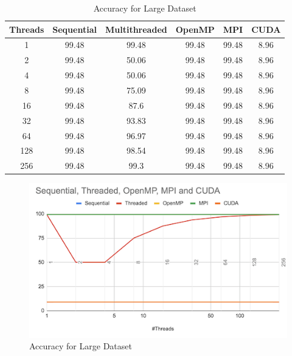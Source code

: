 \documentclass[conference]{IEEEtran}
\begin{document}
\begin{table}
    \begin{tabular}{||c | c | c | c | c | c||} 
     \hline
     Threads & Sequential & Multithreaded & OpenMP & MPI & CUDA \\ [0.1ex] 
     \hline\hline
    1 & 99.48 & 99.48 & 99.48 & 99.48 & 8.96 \\ [.1ex] 
     \hline
    2 & 99.48 & 50.06 & 99.48 & 99.48 & 8.96 \\ [.1ex] 
     \hline
    4 & 99.48 & 50.06 & 99.48 & 99.48 & 8.96 \\ [.1ex] 
     \hline
    8 & 99.48 & 75.09 & 99.48 & 99.48 & 8.96 \\ [.1ex] 
     \hline
    16 & 99.48 & 87.6 & 99.48 & 99.48 & 8.96 \\ [.1ex] 
     \hline
    32 & 99.48 & 93.83 & 99.48 & 99.48 & 8.96 \\ [.1ex] 
     \hline
    64 & 99.48 & 96.97 & 99.48 & 99.48 & 8.96 \\ [.1ex] 
     \hline
    128 & 99.48 & 98.54 & 99.48 & 99.48 & 8.96 \\ [.1ex] 
     \hline
    256 & 99.48 & 99.3 & 99.48 & 99.48 & 8.96 \\ [.1ex] 
     \hline
    \end{tabular}
\caption{\label{tab:Table6}Accuracy for Large Dataset}
\end{table}

\begin{figure}[htbp]
    \centerline{\includegraphics{report/acc_large_set.png}}
    \caption{Accuracy for Large Dataset}
    \label{fig6}
\end{figure}
\end{document}
